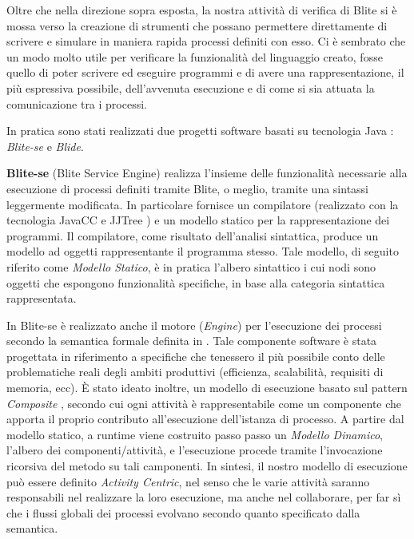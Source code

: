 Oltre che nella direzione sopra esposta, la nostra attività di verifica di
Blite si è mossa verso la creazione di strumenti che possano permettere
direttamente di scrivere e simulare in maniera rapida processi definiti con
esso. Ci è sembrato che un modo molto utile per verificare la funzionalità del
linguaggio creato, fosse quello di poter scrivere ed eseguire programmi e di avere una
rappresentazione, il più espressiva possibile, dell'avvenuta esecuzione e di
come si sia attuata la comunicazione tra i processi.

In pratica sono stati realizzati due progetti software basati su tecnologia
Java \cite{Java}: \emph{Blite-se} e \emph{Blide}. 

\textbf{Blite-se} (Blite Service Engine) realizza l'insieme delle funzionalità
necessarie alla esecuzione di processi definiti tramite Blite, o meglio, tramite
una sintassi leggermente modificata. In particolare fornisce un compilatore
(realizzato con la tecnologia JavaCC e JJTree \cite{JavaCC}) e un modello
statico per la rappresentazione dei programmi. Il compilatore, come risultato
dell'analisi sintattica, produce un modello ad oggetti rappresentante il programma stesso.
Tale modello, di seguito riferito come \emph{Modello Statico}, è in pratica
l'albero sintattico i cui nodi sono oggetti che espongono funzionalità
specifiche, in base alla categoria sintattica rappresentata.

In Blite-se è realizzato anche il motore (\emph{Engine}) per l'esecuzione dei
processi secondo la semantica formale definita in \cite{LaPuTie1}. Tale
componente software è stata progettata in riferimento a specifiche che tenessero
il più possibile conto delle problematiche reali degli ambiti produttivi
(efficienza, scalabilità, requisiti di memoria, ecc). \`E stato ideato inoltre,
un modello di esecuzione basato sul pattern \emph{Composite} \cite{GANGo4},
secondo cui ogni attività è rappresentabile come un componente che apporta il
proprio contributo all'esecuzione dell'istanza di processo. A partire dal modello
statico, a runtime viene costruito passo passo un \emph{Modello Dinamico},
l'albero dei componenti/attività, e l'esecuzione procede tramite l'invocazione
ricorsiva del metodo  su tali camponenti. In sintesi, il
nostro modello di esecuzione può essere definito \emph{Activity Centric}, nel
senso che le varie attività saranno responsabili nel realizzare la loro
esecuzione, ma anche nel collaborare, per far sì che i flussi globali dei
processi evolvano secondo quanto specificato dalla semantica.

